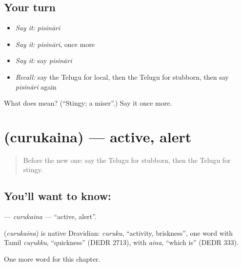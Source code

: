 \subsection*{Your turn}
\begin{itemize}
\raggedright
  \item \emph{Say it:} \emph{pisināri}
  \item \emph{Say it:} \emph{pisināri}, once more
  \item \emph{Say it:} say \emph{pisināri}
  \item \emph{Recall:} say the Telugu for local, then the Telugu for stubborn, then say \emph{pisināri} again
\end{itemize}

\begin{tcolorbox}[breakable,colback=teal!4,colframe=teal!35!black,title={Before you move on}]
What does  mean? (\textquotedblleft{}Stingy; a miser\textquotedblright{}.) Say it once more.
\end{tcolorbox}
\section[\texorpdfstring{\te{చురుకైన} (curukaina)}{చురుకైన (curukaina)}]{ (curukaina) — active, alert}

\label{lesson:TE-C297-curukaina}



\begin{quote}
Before the new one: say the Telugu for stubborn, then the Telugu for stingy.
\end{quote}

\subsection*{You'll want to know: }
\textbf{} — \emph{curukaina} — \textquotedblleft{}active, alert\textquotedblright{}.

\begin{cousinweb}
\textbf{} (\emph{curukaina}) is native Dravidian: \emph{curuku}, \textquotedblleft{}activity, briskness\textquotedblright{}, one word with Tamil \emph{cuṟukku}, \textquotedblleft{}quickness\textquotedblright{} (DEDR 2713), with \emph{aina}, \textquotedblleft{}which is\textquotedblright{} (DEDR 333).
\end{cousinweb}

\begin{grammarlens}[title={What you've built}]
One more word for this chapter.
\end{grammarlens}

